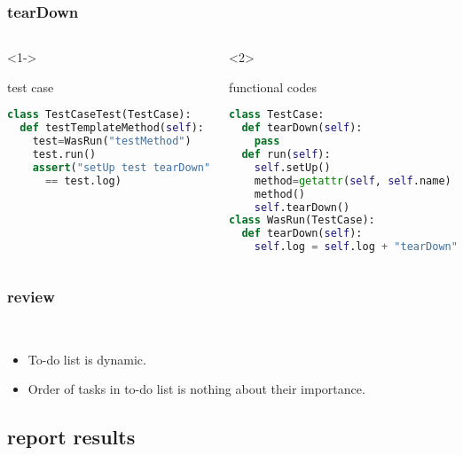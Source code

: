 \documentclass[lualatex]{beamer}
\begin{document}
\begin{frame}[fragile,t]
    \frametitle{tearDown}

    \begin{columns}[t]
        \small
        \begin{onlyenv}<1->
            \begin{block}{test case}
                \begin{lstlisting}[language=Python,columns=fullflexible]
class TestCaseTest(TestCase):
  def testTemplateMethod(self):
    test=WasRun("testMethod")
    test.run()
    assert("setUp test tearDown"
      == test.log)
                \end{lstlisting}
            \end{block}
        \end{onlyenv}

        \begin{onlyenv}<2>
            \begin{block}{functional codes}
                \begin{lstlisting}[language=Python,columns=fullflexible]
class TestCase:
  def tearDown(self):
    pass
  def run(self):
    self.setUp()
    method=getattr(self, self.name)
    method()
    self.tearDown()
class WasRun(TestCase):
  def tearDown(self):
    self.log = self.log + "tearDown"
                \end{lstlisting}
            \end{block}
        \end{onlyenv}

    \end{columns}
\end{frame}

\begin{frame}
  \frametitle{review}

  \begin{block}{~}
    \begin{itemize}
    \item 
      To-do list is dynamic.
    \item 
      Order of tasks in to-do list is nothing about their importance.
    \end{itemize}
  \end{block}
\end{frame}

\subsection{report results}
\end{document}
